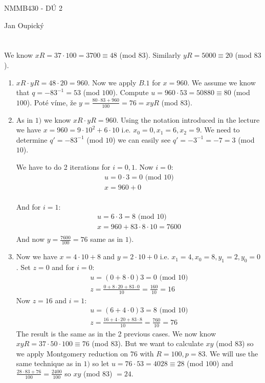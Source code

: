 \documentclass[12pt, a4paper]{article}
\begin{document}
\begin{center}
\large NMMB430 - DÚ 2

\normalsize Jan Oupický
\end{center}
\vspace{1\baselineskip}

\section{}
We know $xR = 37\cdot 100 = 3700 \equiv 48$ (mod $83$). Similarly $yR = 5000 \equiv 20$ (mod $83$).
\begin{enumerate}
\item $xR \cdot yR = 48\cdot 20 = 960$. Now we apply $B.1$ for $x = 960$. We assume we know that $q = - 83^{-1} = 53$ (mod $100$). Compute $u = 960\cdot 53 = 50880 \equiv 80$ (mod $100$). Poté víme, že $y = \frac{80\cdot 83 + 960}{100} = 76 = xyR$ (mod $83$).

\item As in $1)$ we know $xR\cdot yR = 960$. Using the notation introduced in the lecture we have $x = 960 = 9\cdot 10^2 + 6 \cdot 10$ i.e. $x_0 = 0, x_1 = 6, x_2 = 9$. We need to determine $q' = -83^{-1}$ (mod $10$) we can easily see $q' = -3^{-1} = -7 = 3$ (mod $10$).

We have to do 2 iterations for $i = 0,1$. Now $i=0$:
\begin{gather*}
u = 0\cdot 3 = 0 \text{ (mod }10\text{)}\\
x = 960+0\\
\end{gather*}

And for $i=1$:
\begin{gather*}
u = 6\cdot 3 = 8 \text{ (mod }10\text{)}\\
x = 960+83\cdot 8 \cdot 10 = 7600\\
\end{gather*}
And now $y = \frac{7600}{100} = 76$ same as in $1)$.

\item Now we have $x = 4\cdot 10 + 8$ and $y = 2\cdot 10 + 0$ i.e. $x_1=4, x_0=8, y_1 = 2, y_0 = 0$. Set $z=0$ and for $i=0$:
\begin{gather*}
u = (0+ 8\cdot 0)3 = 0 \text{ (mod }10\text{)}\\
z = \frac{0+8\cdot 20 + 83\cdot 0}{10} = \frac{160}{10} = 16
\end{gather*}
Now $z=16$ and $i=1$:
\begin{gather*}
u = (6+ 4\cdot 0)3 = 8 \text{ (mod }10\text{)}\\
z = \frac{16+4\cdot 20 + 83\cdot 8}{10} = \frac{760}{10} = 76
\end{gather*}
The result is the same as in the 2 previous cases. We now know $xyR = 37\cdot50\cdot100 \equiv 76$ (mod $83$). But we want to calculate $xy$ (mod $83$) so we apply Montgomery reduction on $76$ with $R=100, p=83$. We will use the same technique as in $1)$ so let $u = 76 \cdot 53 = 4028 \equiv 28$ (mod $100$) and $\frac{28\cdot 83 + 76}{100} = \frac{2400}{100}$ so $xy$ (mod $83$) $= 24$.

\end{enumerate}
\end{document}
